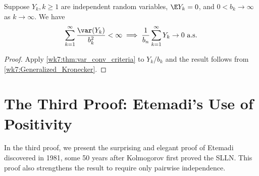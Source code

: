 \documentclass[../aipt.tex]{subfiles}
\begin{document}
\begin{Theorem} Suppose $Y_k, k \geq 1$ are independent random variables, $\E Y_k = 0$, and $0< b_k \to \infty$ as $k\to\infty$. We have
\begin{align*}
\sum_{k=1}^{\infty} \frac{\var(Y_k)}{b_k^2} < \infty
\implies
\frac{1}{b_n} \sum_{k=1}^{\infty} Y_k \to 0 \ \text{a.s.}
\end{align*}
\end{Theorem}
\begin{proof}
Apply \cref{wk7:thm:var_conv_criteria} to $Y_k/b_k$ and the result follows from \cref{wk7:Generalized_Kronecker}.
\end{proof}

\section{The Third Proof: Etemadi's Use of Positivity}

In the third proof, we present the surprising and elegant proof of Etemadi discovered in 1981, some 50 years after Kolmogorov first proved the SLLN. This proof also strengthens the result to require only pairwise independence.
\end{document}
